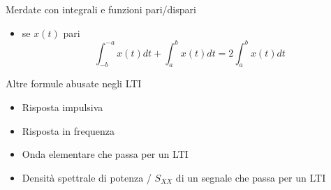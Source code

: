\documentclass{article}
\begin{document}

Merdate con integrali e funzioni pari/dispari
\begin{itemize}
  \item se $x(t)$ pari \begin{equation*}
    \int_{-b}^{-a} x(t) dt + \int_{a}^{b} x(t) dt = 2\int_{a}^{b} x(t) dt
  \end{equation*}
\end{itemize}

Altre formule abusate negli LTI
\begin{itemize}
  \item Risposta impulsiva
  \item Risposta in frequenza
  \item Onda elementare che passa per un LTI
  \item Densità spettrale di potenza / $S_{XX}$ di un segnale che passa per un LTI
\end{itemize}
\end{document}
